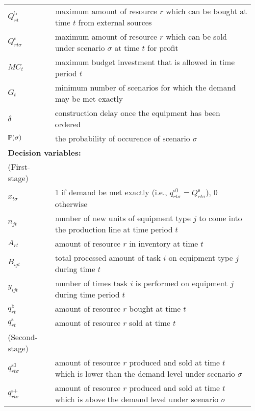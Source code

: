 \begin{table}[H]
{\begin{tabular}{ll}
			$Q_{rt}^\textrm{b}$ & maximum amount of resource $r$ which can be bought at time $t$ from external sources\\
			$Q_{rt\sigma}^\textrm{s}$ & maximum amount of resource $r$ which can be sold under scenario $\sigma$ at time $t$ for profit\\
			$MC_t$ & maximum budget investment that is allowed in time period $t$\\
			$G_t$ & minimum number of scenarios for which the demand may be met exactly \\
			$\delta$ & construction delay once the equipment has been ordered\\	
			$\operatorname*{\mathbb{P}}(\sigma)$ & \textrm{the probability of occurence of scenario $\sigma$} \\ \midrule
			\multicolumn{2}{l}{\textbf{Decision variables:}} \\
			\textrm{(First-stage)} \nonumber\\
			$x_{t\sigma }$ & 1 if demand be met exactly (i.e., $q_{rt\sigma}^{\textrm{s0}}=Q_{rt\sigma}^{\textrm{s}}$), 0 otherwise\\	
			$n_{jt}$ & number of new units of equipment type $j$ to come into the production line at time period $t$\\
			$A_{rt}$ & amount of resource $r$ in inventory at time $t$\\
			$B_{ijt}$ & total processed amount of task $i$ on equipment type $j$ during time $t$\\
			$y_{ijt}$ & number of times task $i$ is performed on equipment $j$ during time period $t$\\
			$q_{rt}^\textrm{b}$ & amount of resource $r$ bought at time $t$\\
			$q_{rt}^\textrm{s}$ & amount of resource $r$ sold at time $t$\\
			\textrm{(Second-stage)} \nonumber\\
			$q_{rt\sigma}^\textrm{s0}$ & amount of resource $r$ produced and sold at time $t$ which is lower than the demand level under scenario $\sigma$ \\
			$q_{rt\sigma}^\textrm{s+}$ & amount of resource $r$ produced and sold at time $t$ which is above the demand level under scenario $\sigma$ \\
			\bottomrule
		\end{tabular}
	}
\end{table} 


